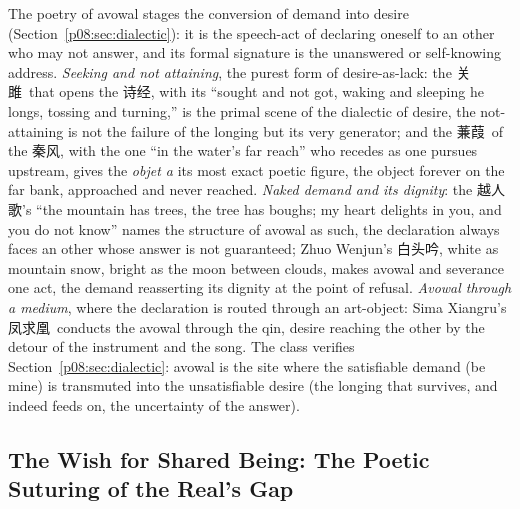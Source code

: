 The poetry of avowal stages the conversion of demand into desire (Section~\ref{p08:sec:dialectic}): it is the speech-act of declaring oneself to an other who may not answer, and its formal signature is the unanswered or self-knowing address. \emph{Seeking and not attaining}, the purest form of desire-as-lack: the \cjkfont 关雎\normalfont\ that opens the \cjkfont 诗经\normalfont, with its ``sought and not got, waking and sleeping he longs, tossing and turning,'' is the primal scene of the dialectic of desire, the not-attaining is not the failure of the longing but its very generator; and the \cjkfont 蒹葭\normalfont\ of the \cjkfont 秦风\normalfont, with the one ``in the water's far reach'' who recedes as one pursues upstream, gives the \textit{objet a} its most exact poetic figure, the object forever on the far bank, approached and never reached. \emph{Naked demand and its dignity}: the \cjkfont 越人歌\normalfont's ``the mountain has trees, the tree has boughs; my heart delights in you, and you do not know'' names the structure of avowal as such, the declaration always faces an other whose answer is not guaranteed; Zhuo Wenjun's \cjkfont 白头吟\normalfont, white as mountain snow, bright as the moon between clouds, makes avowal and severance one act, the demand reasserting its dignity at the point of refusal. \emph{Avowal through a medium}, where the declaration is routed through an art-object: Sima Xiangru's \cjkfont 凤求凰\normalfont\ conducts the avowal through the qin, desire reaching the other by the detour of the instrument and the song. The class verifies Section~\ref{p08:sec:dialectic}: avowal is the site where the satisfiable demand (be mine) is transmuted into the unsatisfiable desire (the longing that survives, and indeed feeds on, the uncertainty of the answer).

\subsection{The Wish for Shared Being: The Poetic Suturing of the Real's Gap}\label{p08:sec:case-wish}

